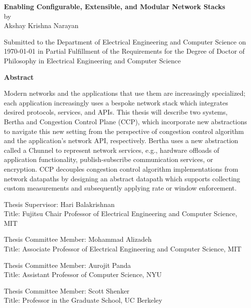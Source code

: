 \documentclass[fontsize=12pt,paper=letter]{scrartcl}
\begin{document}
\begin{titlepage}
  \begin{center}
    \textbf{\large Enabling Configurable, Extensible, and Modular Network Stacks}\\
    \vspace{0.3\baselineskip}
    by\\
    \vspace{0.3\baselineskip}
    {\large Akshay Krishna Narayan}\\
    \vspace{0.4\baselineskip}
    \begin{addmargin}[0.5in]{0.5in}
      \centering
      Submitted to the Department of Electrical Engineering and Computer Science
      on \today{} in Partial Fulfillment of the Requirements for the Degree of
      Doctor of Philosophy in Electrical Engineering and Computer Science
    \end{addmargin}
  \end{center}

  \begin{flushleft}
  \textbf{Abstract}
  \vspace{0.5\baselineskip}

Modern networks and the applications that use them are increasingly specialized; each application increasingly uses a bespoke network stack which integrates desired protocols, services, and APIs. This thesis will describe two systems, Bertha and Congestion Control Plane (CCP), which incorporate new abstractions to navigate this new setting from the perspective of congestion control algorithm and the application's network API, respectively.
Bertha uses a new abstraction called a Chunnel to represent network services, e.g., hardware offloads of application functionality, publish-subscribe communication services, or encryption.
CCP decouples congestion control algorithm implementations from network datapaths by designing an abstract datapath which supports collecting custom measurements and subsequently applying rate or window enforcement.

  \bigskip

  \vspace{0.5\baselineskip}
  Thesis Supervisor: Hari Balakrishnan\\
  Title: Fujitsu Chair Professor of Electrical Engineering and Computer Science, MIT

  \vspace{0.2\baselineskip}

  Thesis Committee Member: Mohammad Alizadeh\\
  Title: Associate Professor of Electrical Engineering and Computer Science, MIT
  
  \vspace{0.2\baselineskip}
  Thesis Committee Member: Aurojit Panda\\
  Title: Assistant Professor of Computer Science, NYU

  \vspace{0.2\baselineskip}
  Thesis Committee Member: Scott Shenker\\
  Title: Professor in the Graduate School, UC Berkeley
  \end{flushleft}
\end{titlepage}
\end{document}
